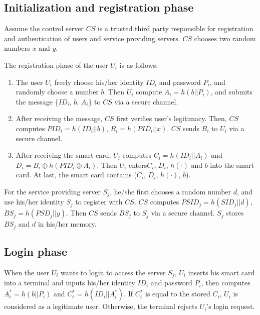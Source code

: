 \documentclass[preprint,12pt]{elsarticle}
\begin{document}
\subsection{Initialization and registration phase}
Assume the control server $CS$ is a trusted third party responsible for registration and authentication of users and service providing servers. $CS$ chooses two random numbers $x$ and $y$.

The registration phase of the user $U_i$ is as follows:

\begin{enumerate}[Step 1:]
\item
The user $U_i$ freely choose his/her identity $ID_i$ and password $P_i$, and randomly choose a number $b$. Then $U_i$ compute $A_i=h(b||P_i)$, and submits the message \{$ID_i$, $b$, $A_i$\} to $CS$ via a secure channel.
\item
After receiving the message, $CS$ first verifies user's legitimacy. Then, $CS$ computes $PID_i=h(ID_i||b)$, $B_i=h(PID_i||x)$. $CS$ sends $B_i$ to $U_i$ via a secure channel.
\item
After receiving the smart card, $U_i$ computes $C_i=h(ID_i||A_i)$ and $D_i=B_i\oplus h(PID_i\oplus A_i)$. Then $U_i$ enters$C_i$, $D_i$, $h(\cdot)$ and $b$ into the smart card. At last, the smart card contains ($C_i$, $D_i$, $h(\cdot)$, $b$).
\end{enumerate}

For the service providing server $S_j$, he/she first chooses a random number $d$, and use his/her identity $S_j$ to register with $CS$. $CS$ computes $PSID_j=h(SID_j||d)$, $BS_j=h(PSD_j||y)$. Then $CS$ sends $BS_j$ to $S_j$ via a secure channel. $S_j$ stores $BS_j$ and $d$ in his/her memory.

\subsection{Login phase}
When the user $U_i$ wants to login to access the server $S_j$, $U_i$ inserts his smart card into a terminal and inputs his/her identity $ID_i$ and password $P_i$, then computes $A^*_i=h(b||P_i)$ and $C^*_i=h(ID_i||A^*_i)$. If $C^*_i$ is equal to the stored $C_i$, $U_i$ is considered as a legitimate user. Otherwise, the terminal rejects $U_i$'s login request.
\end{document}
